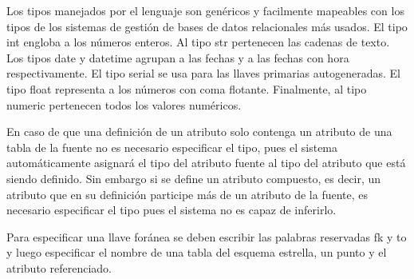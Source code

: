 Los tipos manejados por el lenguaje son gen\'ericos y facilmente mapeables con los tipos de los sistemas de 
gesti\'on de bases de datos relacionales m\'as usados. El tipo int engloba a los n\'umeros enteros. 
Al tipo str pertenecen las cadenas de texto. Los tipos date y datetime agrupan a las fechas y a las fechas con 
hora respectivamente. El tipo serial se usa para las llaves primarias autogeneradas. El tipo float 
representa a los n\'umeros con coma flotante. Finalmente, al tipo numeric pertenecen todos los valores numéricos.

En caso de que una definición de un atributo solo contenga un atributo de una tabla de la fuente no es necesario 
especificar el tipo, pues el sistema autom\'aticamente asignar\'a el tipo del atributo fuente al tipo del 
atributo que est\'a siendo definido. Sin embargo si se define un atributo compuesto, es decir, un atributo que 
en su definición participe m\'as de un atributo de la fuente, es necesario especificar el tipo pues el sistema 
no es capaz de inferirlo.

Para especificar una llave for\'anea se deben escribir las palabras reservadas fk y to y luego especificar 
el nombre de una tabla del esquema estrella, un punto y el atributo referenciado. 